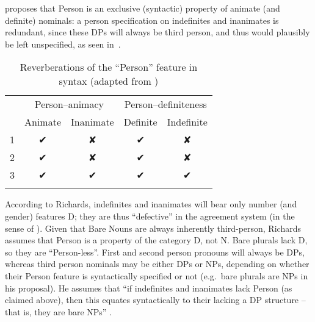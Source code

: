 \documentclass[output=paper]{langsci/langscibook}
\begin{document}
\citet[140]{Richards2008} proposes that Person is an exclusive (syntactic)
property of animate (and definite) nominals: a person
specification on indefinites and inanimates is redundant, since these DPs will
always be third person, and thus would plausibly be left
unspecified, as seen in~.

\begin{table}
\begin{tabular}{lcccc}
\lsptoprule
& \multicolumn{2}{c}{Person--animacy} & \multicolumn{2}{c}{Person--definiteness}\\\cmidrule(lr){2-3}\cmidrule(lr){4-5}
   & Animate & Inanimate & Definite & Indefinite\\
\midrule
1  & ✔       & ✘         & ✔        & ✘\\
2  & ✔       & ✘         & ✔        & ✘\\
3  & ✔       & ✔         & ✔        & ✔\\
\lspbottomrule
\end{tabular}
\caption{Reverberations of the \enquote{Person} feature in syntax (adapted from
\citealt{Richards2008})\label{tab:27.27.1}}
\end{table}

According to Richards, indefinites and inanimates will bear only number (and
gender) features D; they are thus \enquote{defective} in the agreement system
(in the sense of \citealt{Chomsky2001}). Given that Bare Nouns are always
inherently third-person, Richards assumes that Person is a property of the
category D, not N. Bare plurals lack D, so they are \enquote{Person-less}.
First and second person pronouns will always be DPs,
whereas third person nominals may be either DPs or NPs,
depending on whether their Person feature is syntactically specified or not
(e.g.\ bare plurals are NPs in his proposal). He assumes that ``if indefinites
and inanimates lack Person (as claimed above), then this equates syntactically
to their lacking a DP structure -- that is, they are bare NPs''
\citep[140]{Richards2008}.
\end{document}
